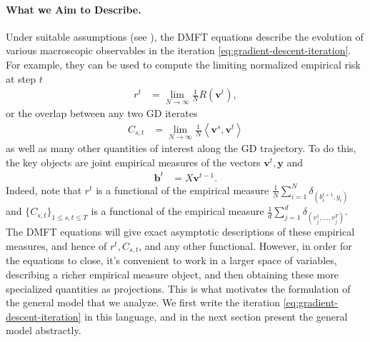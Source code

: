 \documentclass{article}
\newcommand{\1}{\mathbbm{1}}
\theoremstyle{plain}
\theoremstyle{definition}
\theoremstyle{remark}
\newcommand{\bfy}{\boldsymbol{y}}
\newcommand{\bfv}{\boldsymbol{v}}
\newcommand{\bfb}{\boldsymbol{b}}
\newcommand{\brac}[1]{\left\langle #1\right\rangle}
\begin{document}
\paragraph{What we Aim to Describe.} Under suitable assumptions (see ), the DMFT equations describe the evolution of various macroscopic observables in the iteration \eqref{eq:gradient-descent-iteration}. For example, they can be used to compute the limiting normalized empirical risk at step $t$
\begin{align*}
    r^t&= \lim_{N\to\infty}\frac{1}{N} R(\bfv^t),
\end{align*}
or the overlap between any two GD iterates
\begin{align*}
    C_{s,t}&=\lim_{N\to\infty}\frac{1}{N} \brac{\bfv^s,\bfv^t}
\end{align*}
as well as many other quantities of interest along the GD trajectory. To do this, the key objects are joint empirical measures of the vectors $\bfv^t, \bfy$ and
\begin{align*}
    \bfb^t &= X \bfv^{t-1}.
\end{align*}
Indeed, note that $r^t$ is a functional of the empirical measure $\frac{1}{N}\sum_{i=1}^N\delta_{(b^{t+1}_i,y_i)}$ and $\{C_{s,t}\}_{1\leq s,t\leq T}$ is a functional of the empirical measure $\frac{1}{d}\sum_{j=1}^d\delta_{(v_j^1,\dots,v_j^T)}$. The DMFT equations will give exact asymptotic descriptions of these empirical measures, and hence of $r^t,C_{s,t}$, and any other functional. However, in order for the equations to close, it's convenient to work in a larger space of variables, describing a richer empirical measure object, and then obtaining these more specialized quantities as projections. This is what motivates the formulation of the general model that we analyze. We first write the iteration \eqref{eq:gradient-descent-iteration} in this language, and in the next section present the general model abstractly.
\end{document}
